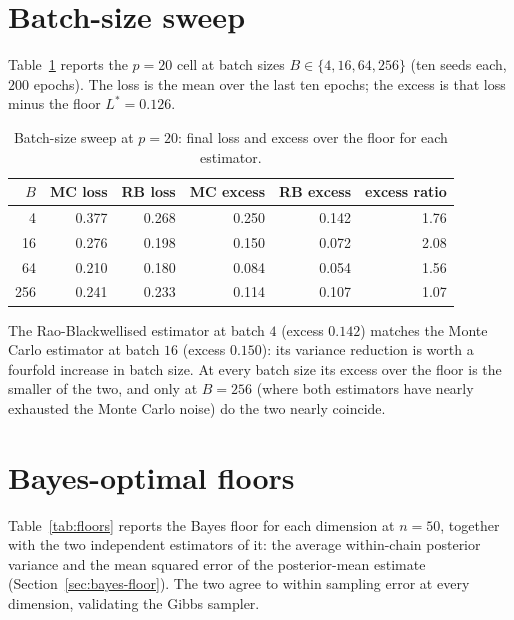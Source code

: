 \section{Batch-size sweep}
\label{app:batch-sweep}

Table~\ref{tab:batch-sweep} reports the $p = 20$ cell at batch sizes
$B \in \{4, 16, 64, 256\}$ (ten seeds each, $200$ epochs). The loss
is the mean over the last ten epochs; the excess is that loss minus
the floor $L^{*} = 0.126$.

\begin{table}[htbp]
  \centering
  \small
  \caption{Batch-size sweep at $p = 20$: final loss and excess over the
  floor for each estimator.}
  \label{tab:batch-sweep}
  \begin{tabular}{r rr rr r}
    \toprule
    $B$ & MC loss & RB loss & MC excess & RB excess & excess ratio \\
    \midrule
    4   & 0.377 & 0.268 & 0.250 & 0.142 & 1.76 \\
    16  & 0.276 & 0.198 & 0.150 & 0.072 & 2.08 \\
    64  & 0.210 & 0.180 & 0.084 & 0.054 & 1.56 \\
    256 & 0.241 & 0.233 & 0.114 & 0.107 & 1.07 \\
    \bottomrule
  \end{tabular}
\end{table}

The Rao-Blackwellised estimator at batch $4$ (excess $0.142$) matches
the Monte Carlo estimator at batch $16$ (excess $0.150$): its variance
reduction is worth a fourfold increase in batch size. At every batch
size its excess over the floor is the smaller of the two, and only at
$B = 256$ (where both estimators have nearly exhausted the Monte
Carlo noise) do the two nearly coincide.

\section{Bayes-optimal floors}
\label{app:floors}

Table~\ref{tab:floors} reports the Bayes floor for each dimension at
$n = 50$, together with the two independent estimators of it: the
average within-chain posterior variance and the mean squared error of
the posterior-mean estimate (Section~\ref{sec:bayes-floor}). The two
agree to within sampling error at every dimension, validating the Gibbs
sampler.

